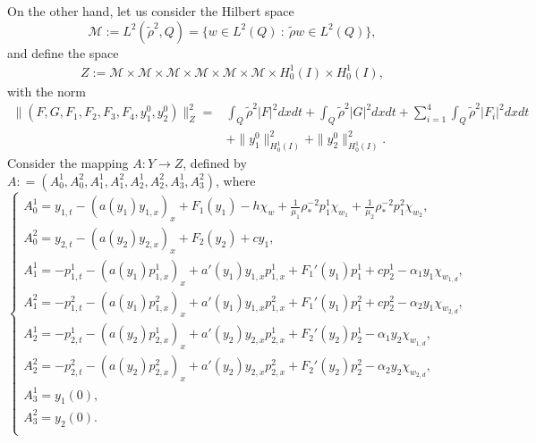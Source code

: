 \documentclass[11pt,a4paper]{amsart}
\numberwithin{equation}{section}
\begin{document}
On the other hand, let us consider the Hilbert space
$$\mathcal{ M}:= L^2(\tilde{\rho}^2,Q) = \{ w \in L^2(Q) \ : \ \tilde{\rho} w \in L^2(Q) \},$$ 
and define the space
\begin{eqnarray*}
    Z:= \mathcal{ M} \times \mathcal{ M} \times \mathcal{ M} \times \mathcal{ M} \times \mathcal{ M} \times \mathcal{ M} \times H^1_0(I) \times H^1_0(I),
\end{eqnarray*}
with the norm
\begin{equation*}
    \begin{split}
        \| (F,G,F_1,F_2,F_3,F_4,y^{0}_1,y^{0}_{2}) \|_Z^2 = &\int_Q \tilde{\rho}^2 |F|^2 dxdt + \int_Q \tilde{\rho}^2 |G|^2 dxdt + \sum_{i=1}^4 \int_Q \tilde{\rho}^2 |F_i|^2 dxdt \\
        &+ \|y^{0}_{1}\|_{H_0^1(I)}^2+ \|y^{0}_{2}\|_{H_0^1(I)}^2.
    \end{split}
\end{equation*}
Consider the mapping $A:Y \to Z$, defined by $A: = (A_0^1,A_0^2,A_1^1,A_1^2,A_2^1,A_2^2,A_3^1,A_3^2)$,  where
\begin{equation} \label{aplicação A}
	\begin{cases}
		A_0^1 =  y_{1,t}-(a(y_1)y_{1,x})_x + F_1(y_1)   - h\chi_w+\frac{1}{\mu_1} \rho_*^{-2} p_1^1\chi_{w_1}+\frac{1}{\mu_2} \rho_*^{-2} p_1^2\chi_{w_2}, \\  
		A_0^2 = y_{2,t}-(a(y_2)y_{2,x})_x + F_2(y_2) + c y_1,  \\
        A_1^1 = -p_{1,t}^1 - (a(y_1)p_{1,x}^1)_x + a'(y_1)y_{1,x}p_{1,x}^1+F_1'(y_1)p_1^1+cp_2^1-\alpha_1 y_1 \chi_{w_{1,d}}, \\
		A_1^2 = -p_{1,t}^2 - (a(y_1)p_{1,x}^2)_x + a'(y_1) y_{1,x} p_{1,x}^2 + F_1'(y_1)p_1^2+cp_2^2-\alpha_2 y_1 \chi_{w_{2,d}}, \\
		A_2^1 = -p_{2,t}^1 - (a(y_2)p_{2,x}^1)_x + a'(y_2) y_{2,x} p_{2,x}^1 + F_2'(y_2)p_2^1-\alpha_1 y_2 \chi_{w_{1,d}}, \\
		A_2^2 = -p_{2,t}^2 - (a(y_2)p_{2,x}^2)_x +a'(y_2)y_{2,x}p_{2,x}^2 + F_2'(y_2)p_2^2 - \alpha_2 y_2 \chi_{w_{2,d}}, \\
		A_3^1 = y_1(0),\\
        A_3^2 = y_2(0).\\
	\end{cases}
\end{equation}
\end{document}
